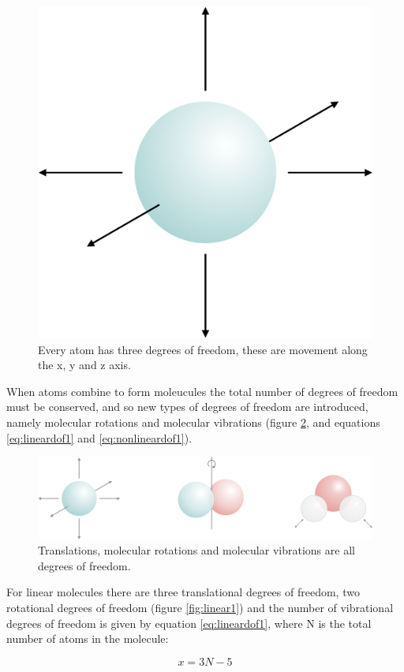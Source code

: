\documentclass[
]{book}
\begin{document}
\begin{figure}

{\centering \includegraphics[width=0.5\linewidth]{images/atomdegrees} 

}

\caption{Every atom has three degrees of freedom, these are movement along the x, y and z axis.}\label{fig:atomdegrees1}
\end{figure}

When atoms combine to form moleucules the total number of degrees of freedom must be conserved, and so new types of degrees of freedom are introduced, namely molecular rotations and molecular vibrations (figure \ref{fig:typesdegree1}, and equations \eqref{eq:lineardof1} and \eqref{eq:nonlineardof1}).

\begin{figure}

{\centering \includegraphics[width=0.8\linewidth]{images/typesdegree} 

}

\caption{Translations, molecular rotations and molecular vibrations are all degrees of freedom.}\label{fig:typesdegree1}
\end{figure}

For linear molecules there are three translational degrees of freedom, two rotational degrees of freedom (figure \ref{fig:linear1}) and the number of vibrational degrees of freedom is given by equation \eqref{eq:lineardof1}, where N is the total number of atoms in the molecule:

\begin{equation}
x = 3N-5
\label{eq:lineardof1}
\end{equation}
\end{document}
